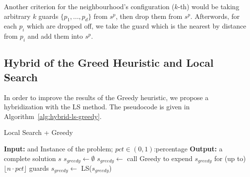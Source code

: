 \documentclass[runningheads,a4paper]{llncs}
\begin{document}
      Another criterion for the neighbourhood's configuration ($k$-th) would be taking arbitrary $k$ guards $\{p_1,...,p_d\}$ from $s^p$, then drop them from $s^p$. Afterwords, for each $p_i$ which are dropped off, we take the guard which is the nearest by distance from $p_i$ and add them into $s^p$.

      \subsection{Hybrid of the Greed Heuristic and Local Search}

       In order to improve the results of the Greedy heuristic, we propose a hybridization with the LS method.
       The pseudocode is given in Algorithm~\ref{alg:hybrid-ls-greedy}.
        \begin{algorithm}[!t]
       	\caption{Local Search + Greedy}\label{alg:hybrid-ls-greedy}
       	\begin{algorithmic}
       		   	\State \textbf{Input:} and Instance of the problem; $pct\in (0,1)$:percentage
       		    \State \textbf{Output:} a complete solution $s$
       		    \State $s_{greedy} \gets \emptyset$
       		        \State $s_{greedy} \gets$ call Greedy to expend $s_{greedy}$ for (up to) $\lfloor n \cdot pct \rfloor$ guards
       		        \State $s_{greedy} \gets$ LS($s_{greedy}$)
       		    \EndWhile
       \end{algorithmic}
       \end{algorithm}	
\end{document}
